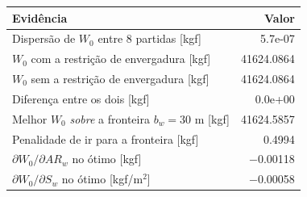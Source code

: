 \begin{tabular}{lr}
\toprule
Evidência & Valor \\
\midrule
Dispersão de $W_0$ entre 8 partidas [kgf] & 5.7e-07 \\
$W_0$ com a restrição de envergadura [kgf] & 41624.0864 \\
$W_0$ sem a restrição de envergadura [kgf] & 41624.0864 \\
Diferença entre os dois [kgf] & 0.0e+00 \\
Melhor $W_0$ \emph{sobre} a fronteira $b_w=30$ m [kgf] & 41624.5857 \\
Penalidade de ir para a fronteira [kgf] & 0.4994 \\
$\partial W_0/\partial AR_w$ no ótimo [kgf] & $-$0.00118 \\
$\partial W_0/\partial S_w$ no ótimo [kgf/m$^2$] & $-$0.00058 \\
\bottomrule
\end{tabular}